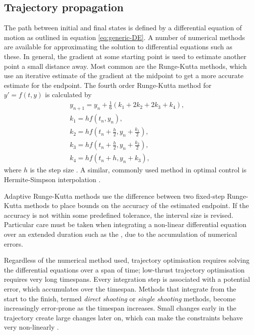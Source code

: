 \subsection{Trajectory propagation} \label{sub:Propagation}
The path between initial and final states is defined by a differential equation of motion as outlined in equation \eqref{eq:generic-DE}. A number of numerical methods are available for approximating the solution to differential equations such as these. In general, the gradient at some starting point is used to estimate another point a small distance away. Most common are the Runge-Kutta methods, which use an iterative estimate of the gradient at the midpoint to get a more accurate estimate for the endpoint. The fourth order Runge-Kutta method for $y'=f(t,y)$ is calculated by
\begin{subequations} \label{eq:RK4}
\begin{gather}
y_{n+1}=y_n+\frac{1}{6}\left(k_1+2k_2+2k_3+k_4\right), \\
k_1=hf\left(t_n,y_n\right), \\
k_2=hf\left(t_n+\frac{h}{2},y_n+\frac{k_1}{2}\right), \\
k_3=hf\left(t_n+\frac{h}{2},y_n+\frac{k_2}{2}\right), \\
k_4=hf\left(t_n+h,y_n+k_3\right),
\end{gather}
\end{subequations}
where $h$ is the step size \parencite{recipes}. A similar, commonly used method in optimal control is Hermite-Simpson interpolation \parencite{recipes}.

Adaptive Runge-Kutta methods use the difference between two fixed-step Runge-Kutta methods to place bounds on the accuracy of the estimated endpoint. If the accuracy is not within some predefined tolerance, the interval size is revised. Particular care must be taken when integrating a non-linear differential equation over an extended duration such as the \BW, due to the accumulation of numerical errors.


Regardless of the numerical method used, trajectory optimisation requires solving the differential equations over a span of time; low-thrust trajectory optimisation requires very long timespans. Every integration step is associated with a potential error, which accumulates over the timespan. Methods that integrate from the start to the finish, termed \emph{direct shooting} or \emph{single shooting} methods, become increasingly error-prone as the timespan increases. Small changes early in the trajectory create large changes later on, which can make the constraints behave very non-linearly \parencite{Betts1998}. 

